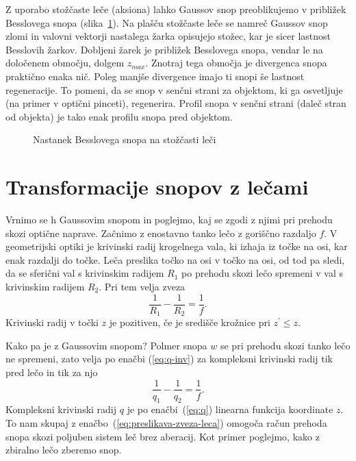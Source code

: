 \begin{remark}
Z uporabo stožčaste leče (aksiona) lahko Gaussov snop
preoblikujemo v približek Besslovega snopa (slika~\ref{fig:Bessel_leca}). 
Na plašču stožčaste leče se namreč Gaussov snop zlomi in valovni vektorji 
nastalega žarka opisujejo stožec, kar je sicer lastnost Besslovih žarkov.
Dobljeni žarek je približek Besslovega snopa, vendar le na določenem območju, dolgem $z_{max}$.
Znotraj tega območja je divergenca snopa praktično enaka nič. Poleg manjše divergence
imajo ti snopi še lastnost regeneracije. To pomeni, da se snop v senčni strani
za objektom, ki ga osvetljuje (na primer v optični pinceti), regenerira. 
Profil snopa v senčni strani (daleč stran od objekta) je tako enak profilu 
snopa pred objektom. 
\begin{figure}[h]
\centering
\def\svgwidth{100truemm} 

\caption{Nastanek Besslovega snopa na stožčasti leči}
\label{fig:Bessel_leca}
\end{figure}
\end{remark}

\section{Transformacije snopov z lečami}

Vrnimo se h Gaussovim snopom in poglejmo, kaj se zgodi z njimi pri prehodu
skozi optične naprave. Začnimo
z enostavno tanko lečo z goriščno razdaljo $f$. V geometrijski optiki
je krivinski radij krogelnega vala, ki izhaja iz točke na osi, kar
enak razdalji do točke. Leča preslika točko na osi v točko na osi,
od tod pa sledi, da se sferični val s krivinskim radijem $R_{1}$
po prehodu skozi lečo spremeni v val s krivinskim radijem $R_{2}$.
Pri tem velja zveza 
\begin{equation}
\frac{1}{R_{1}}-\frac{1}{R_{2}}=\frac{1}{f}.
\end{equation}
Krivinski radij v točki $z$ je pozitiven, če je središče krožnice pri $z^{\prime}\le z$.

Kako pa je z Gaussovim snopom? Polmer snopa $w$ se pri prehodu 
skozi tanko lečo ne spremeni, zato velja po enačbi (\ref{eq:q-inv}) za
kompleksni krivinski radij tik pred lečo in tik za njo
\begin{equation}
\frac{1}{q_{1}}-\frac{1}{q_{2}}=\frac{1}{f}.
\label{eq:preslikava-zveza-leca}
\end{equation}
Kompleksni krivinski radij $q$ je po enačbi~(\ref{eq:q}) linearna funkcija koordinate $z$.
To nam skupaj z enačbo~(\ref{eq:preslikava-zveza-leca})
omogoča račun prehoda snopa skozi poljuben sistem leč brez aberacij.
Kot primer poglejmo, kako z zbiralno lečo zberemo snop.

